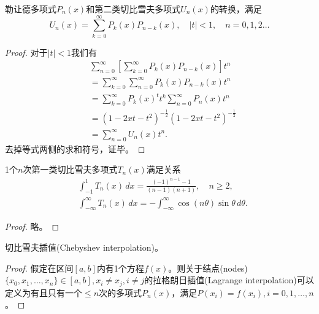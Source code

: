 \begin{subappendices}
\begin{theorem}[勒让德多项式和第二类切比雪夫多项式的转换]
  勒让德多项式$P_n(x)$和第二类切比雪夫多项式$U_n(x)$的转换，满足
  \begin{equation}
    \label{eq:poly-transformation-legendre-chebishev-2}
    U_n(x) = \sum_{k=0}^{\infty} P_k(x) P_{n-k}(x), \quad \left| t \right| <1, \quad n=0,1,2 \ldots
  \end{equation}
\end{theorem}
\begin{proof}
  对于$\left| t \right| <1$我们有
  \begin{equation*}
    \begin{split}
      &\sum_{n=0}^{\infty} \left[ \sum_{k=0}^{\infty} P_{k}(x) P_{n-k}(x) \right] t^n \\
      &= \sum_{k=0}^{\infty} \sum_{n=0}^{\infty} P_k(x) P_{n-k}(x) t^n \\
      &= \sum_{k=0}^{\infty} P_{k}(x)^t t^k \sum_{n=0}^{\infty} P_n(x) t^n \\
      &= \left( 1-2xt-t^2 \right)^{-\frac{1}{2}} \left( 1-2xt-t^2 \right)^{-\frac{1}{2}} \\
      &= \sum_{n=0}^{\infty} U_n(x) t^n.
    \end{split}
  \end{equation*}
  去掉等式两侧的求和符号，证毕。
\end{proof}

\begin{theorem}[第一类切比雪夫多项式与次的关系]
  1个$n$次第一类切比雪夫多项式$T_n(x)$满足关系
  \begin{equation}
    \begin{split}
      &\int_{-1}^{1} T_n(x) \, dx = \frac{(-1)^{n-1} - 1}{(n-1)(n+1)},
       \quad n \ge 2, \\
       &\int_{-\infty}^{\infty} T_n(x) \, dx = - \int_{-\infty}^{\infty} \cos(n \theta) \sin \theta \, d \theta.
    \end{split}
  \end{equation}
\end{theorem}
\begin{proof}
  略。
\end{proof}

\begin{theorem}[切比雪夫插值定理]
  \label{sec:poly-chebyshev-interpolation}
切比雪夫插值(Chebyshev interpolation)。
\end{theorem}
\begin{proof}
假定在区间$[a,b]$内有1个方程$f(x)$。则关于结点(nodes) $\{ x_0, x_1, \ldots, x_n \} \in [a,b], x_i \neq x_j, i \neq j$的拉格朗日插值(Lagrange interpolation)可以定义为有且只有一个$\le n$次的多项式$P_n(x)$，满足$P(x_i) = f(x_i), i=0,1,\ldots,n$。


\end{proof}
\end{subappendices}
